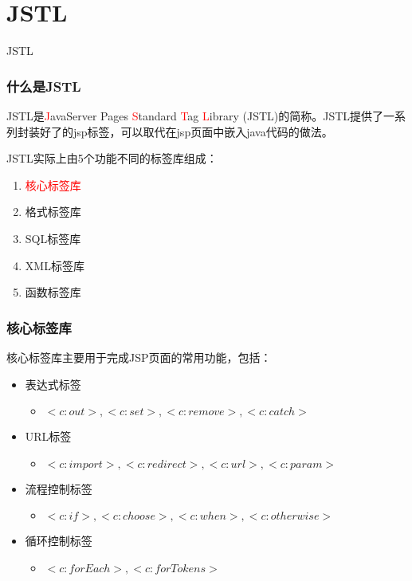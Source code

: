\documentclass{beamer}
\begin{document}
\section{JSTL}
\begin{frame}
\Huge{\centerline{JSTL}}
\end{frame}
\begin{frame}
\frametitle{什么是JSTL}
JSTL是\textcolor{red}{J}avaServer Pages \textcolor{red}{S}tandard \textcolor{red}{T}ag \textcolor{red}{L}ibrary (JSTL)的简称。JSTL提供了一系列封装好了的jsp标签，可以取代在jsp页面中嵌入java代码的做法。

JSTL实际上由5个功能不同的标签库组成：

\begin{enumerate}
\item
\textcolor{red}{核心标签库}
\item
格式标签库
\item
SQL标签库
\item
XML标签库
\item
函数标签库
\end{enumerate}

\end{frame}
\begin{frame}
\frametitle{核心标签库}
核心标签库主要用于完成JSP页面的常用功能，包括：
\begin{itemize}
\item
表达式标签
\begin{itemize}
\item
$<c:out>, <c:set>, <c:remove>, <c:catch>$
\end{itemize}
\item
URL标签
\begin{itemize}
\item
$<c:import>, <c:redirect>, <c:url>, <c:param>$
\end{itemize}
\item
流程控制标签
\begin{itemize}
\item
$<c:if>, <c:choose>, <c:when>, <c:otherwise>$
\end{itemize}
\item
循环控制标签
\begin{itemize}
\item
$<c:forEach>, <c:forTokens>$
\end{itemize}
\end{itemize}
\end{frame}
\end{document}
